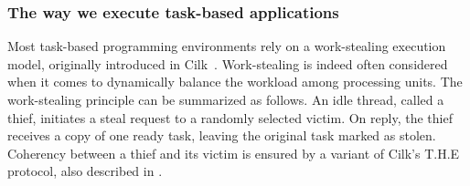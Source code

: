 \documentclass[parallelisme]{compas2016}
\begin{document}




\subsubsection{The way we execute task-based applications}

Most task-based programming environments rely on a work-stealing execution model, originally introduced in Cilk~\cite{cilk5}. 
Work-stealing is indeed often considered when it comes to dynamically balance the workload among processing units. 
The work-stealing principle can be summarized as follows. 
An idle thread, called a thief, initiates a steal request to a randomly selected victim. 
On reply, the thief receives a copy of one ready task, leaving the original task marked as stolen.
Coherency between a thief and its victim is ensured by a variant of Cilk's T.H.E protocol, also described in \cite{cilk5}.
\end{document}

